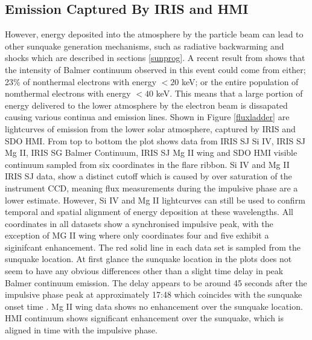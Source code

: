 \subsection{Emission Captured By IRIS and HMI}
However, energy deposited into the atmosphere by the particle beam can lead to other sunquake generation mechanisms, such as radiative backwarming and shocks which are described in sections \ref{sunprog}. A recent result from \cite{2016ApJ...816...88K} shows that the intensity of Balmer continuum observed in this event could come from either; 23\% of nonthermal electrons with energy $<20$ keV; or the entire population of nomthermal electrons with energy $<40$ keV. This means that a large portion of energy delivered to the lower atmosphere by the electron beam is dissapated causing various continua and emission lines. Shown in Figure \ref{fluxladder} are lightcurves of emission from the lower solar atmosphere, captured by IRIS and SDO HMI. From top to bottom the plot shows data from IRIS SJ Si IV, IRIS SJ Mg II, IRIS SG Balmer Continuum, IRIS SJ Mg II wing and SDO HMI visible continuum sampled from six coordinates in the flare ribbon. Si IV and Mg II IRIS SJ data, show a distinct cutoff which is caused by over saturation of the instrument CCD, meaning flux measurements during the impulsive phase are a lower estimate. However, Si IV and Mg II lightcurves can still be used to confirm temporal and spatial alignment of energy deposition at these wavelengths. All coordinates in all datasets show a synchronised impulsive peak, with the exception of MG II wing where only coordinates four and five exhibit a siginifcant enhancement. The red solid line in each data set is sampled from the sunquake location. At first glance the sunquake location in the plots does not seem to have any obvious differences other than a slight time delay in peak Balmer continuum emission. The delay appears to be around 45 seconds after the impulsive phase peak at approximately 17:48 which coincides with the sunquake onset time \citep{2015ApJ...812...35M}. Mg II wing data shows no enhancement over the sunquake location. HMI continuum shows significant enhancement over the sunquake, which is aligned in time with the impulsive phase. 




